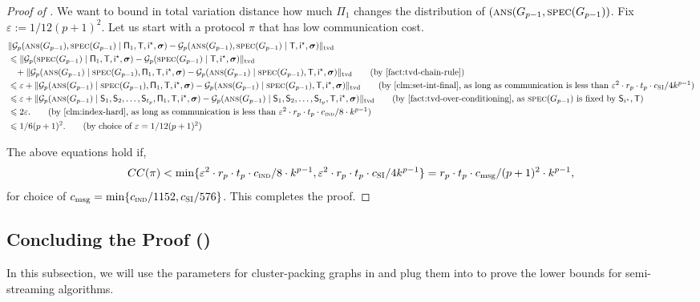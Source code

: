 \documentclass[11pt]{article}
\theoremstyle{definition}
\renewcommand{\leq}{\leqslant}
\newcommand{\tvd}[2]{\ensuremath{\norm{#1 - #2}_{\mathrm{tvd}}}}
\newcommand{\eps}{\ensuremath{\varepsilon}}
\newcommand{\norm}[1]{\ensuremath{\|#1\|}}
\newcommand{\rv}[1]{\ensuremath{{\mathsf{#1}}}\xspace}
\newcommand{\cG}{\ensuremath{\mathcal{G}}}
\newcommand{\ans}{\ensuremath{\textnormal{\textsc{ans}}}}
\newcommand{\spec}{\ensuremath{\textnormal{\textsc{spec}}}}
\newcommand{\istar}{\ensuremath{i^{\star}}}
\newcommand{\prot}{\ensuremath{\pi}}
\newcommand{\Prot}{\ensuremath{\Pi}}
\newcommand{\rProt}{\ensuremath{\rv{\Prot}}}
\newcommand{\rT}{\ensuremath{\rv{T}}}
\newcommand{\rS}{\ensuremath{\rv{S}}}
\newcommand{\rsigma}{\ensuremath{\bm{\sigma}}}
\begin{document}
	\begin{proof}[Proof of ]
		We want to bound in total variation distance how much $\rProt_1$ changes the distribution of $(\ans(G_{p-1}, \spec(G_{p-1}))$. 
		Fix $\eps := 1/12 (p+1)^2$. Let us start with a protocol $\prot$ that has low communication cost. 
		\begin{align*}
			&	\tvd{\cG_p(\ans(G_{p-1}), \spec(G_{p-1}) \mid \rProt_1, \rT,\ristar, \rsigma)}{\cG_p(\ans(G_{p-1}), \spec(G_{p-1}) \mid \rT, \ristar, \rsigma)} \\
			&\leq \tvd{\cG_p( \spec(G_{p-1}) \mid \rProt_1, \rT,\ristar, \rsigma)}{\cG_p(\spec(G_{p-1}) \mid \rT, \ristar, \rsigma)} \\
			&\hspace{3mm} + \tvd{\cG_p(\ans(G_{p-1})  \mid \spec(G_{p-1}), \rProt_1, \rT,\ristar, \rsigma)}{\cG_p(\ans(G_{p-1}) \mid  \spec(G_{p-1}), \rT, \ristar, \rsigma)} \tag{by \Cref{fact:tvd-chain-rule}} \\
			&\leq \eps + \tvd{\cG_p(\ans(G_{p-1})  \mid \spec(G_{p-1}), \rProt_1, \rT,\ristar, \rsigma)}{\cG_p(\ans(G_{p-1}) \mid  \spec(G_{p-1}), \rT, \ristar, \rsigma)}  \tag{by \Cref{clm:set-int-final}, as long as communication is less than $\eps^2 \cdot r_p \cdot t_p \cdot \cSI/4 k^{p-1}$} \\
			&\leq \eps + \tvd{\cG_p(\ans(G_{p-1})  \mid \rS_1, \rS_2, \ldots, \rS_{t_p}, \rProt_1, \rT,\ristar, \rsigma)}{\cG_p(\ans(G_{p-1}) \mid  \rS_1, \rS_2, \ldots, \rS_{t_p}, \rT, \ristar, \rsigma)}  \tag{by \Cref{fact:tvd-over-conditioning}, as $\spec(G_{p-1})$ is fixed by $\rS_{\istar}, \rT$} \\
			&\leq 2 \eps. \tag{by \Cref{clm:index-hard}, as long as communication is less than $\eps^2 \cdot r_p \cdot t_p \cdot \cind/8 \cdot k^{p-1}$} \\
			&\leq 1/6(p+1)^2. \tag{by choice of $\eps = 1/12(p+1)^2$}
		\end{align*}
	
	The above equations hold if,
	\begin{align*}
		CC(\prot) < \min\{\eps^2 \cdot r_p \cdot t_p \cdot \cind/8 \cdot k^{p-1}, \eps^2 \cdot r_p \cdot t_p \cdot \cSI/4 k^{p-1}\} = r_p \cdot t_p  \cdot \cmsg/ (p+1)^2 \cdot k^{p-1}, 
	\end{align*}
	for choice of $c_{\textnormal{msg}} = \min\{c_{\textnormal{\textsc{ind}}}/1152, c_{\textnormal{\textsc{SI}}}/576\}$. This completes the proof. 
	\end{proof}
	
	
	\subsection{Concluding the Proof ()}\label{subsec:thm-adv-res-proof}
	In this subsection, we will use the parameters for cluster-packing graphs in  and plug them into  to prove the lower bounds for semi-streaming algorithms. 
	
\end{document}
